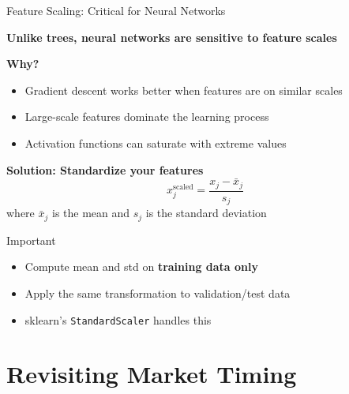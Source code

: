 \documentclass[10pt]{beamer}
\begin{document}
\begin{frame}{Feature Scaling: Critical for Neural Networks}

  \textbf{Unlike trees, neural networks are sensitive to feature scales}

  \vspace{1em}
  \textbf{Why?}
  \begin{itemize}
    \item Gradient descent works better when features are on similar scales
    \item Large-scale features dominate the learning process
    \item Activation functions can saturate with extreme values
  \end{itemize}

  \vspace{1em}
  \textbf{Solution: Standardize your features}
  \[
  x_j^{\text{scaled}} = \frac{x_j - \bar{x}_j}{s_j}
  \]
  where $\bar{x}_j$ is the mean and $s_j$ is the standard deviation

  \vspace{0.5em}
  \begin{block}{Important}
    \begin{itemize}
      \item Compute mean and std on \textbf{training data only}
      \item Apply the same transformation to validation/test data
      \item sklearn's \texttt{StandardScaler} handles this
    \end{itemize}
  \end{block}
\end{frame}

\section{Revisiting Market Timing}
\end{document}
